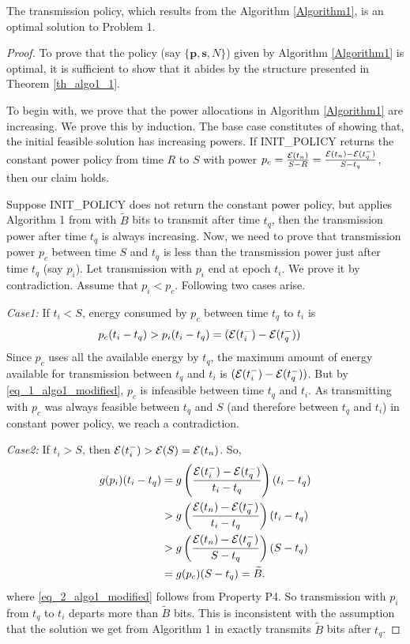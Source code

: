 \begin{theorem}
The transmission policy, which results from the Algorithm \ref{Algorithm1}, is an optimal solution to Problem 1.
\label{th_algo1_2}
\end{theorem}


\begin{proof}
To prove that the policy (say $\{\textbf{p},\textbf{s},N\}$) given by Algorithm \ref{Algorithm1} is optimal, it is sufficient to show that it abides by the structure presented in Theorem \ref{th_algo1_1}.

To begin with, we prove that the power allocations in Algorithm \ref{Algorithm1} are increasing. We prove this by induction. The base case constitutes of showing that, the initial feasible solution has increasing powers. If INIT\_POLICY returns the constant power policy from time $R$ to $S$ with power $p_c=\frac{\mathcal{E}(t_n)}{S-R}=\frac{\mathcal{E}(t_n)-\mathcal{E}(t_q^-)}{S-t_q}$, then our claim holds. 

Suppose INIT\_POLICY does not return the constant power policy, but applies Algorithm 1 from \cite{Yang} with $\widetilde{B}$ bits to transmit after time $t_q$, then the transmission power after time $t_q$ is always increasing. Now, we need to prove that transmission power $p_c$ between time $S$ and $t_q$ is less than the transmission power just after time $t_q$ (say $p_i$). Let transmission with $p_i$ end at epoch $t_i$. We prove it by contradiction. Assume that $p_i<p_c$. Following two cases arise.

\textit{Case1:} If $t_i<S$, energy consumed by $p_c$ between time $t_q$ to $t_i$ is 
\begin{align}
&p_c(t_i-t_q)>p_i(t_i-t_q)=(\ETx(t_i^-)-\ETx(t_q^-))\label{eq_1_algo1_modified}
\end{align}
Since $p_c$ uses all the available energy by $t_q$, the maximum amount of energy available for transmission between $t_q$ and $t_i$ is $(\mathcal{E}(t_i^-)-\mathcal{E}(t_q^-))$. But by \eqref{eq_1_algo1_modified}, $p_c$ is infeasible between time $t_q$ and $t_i$. As transmitting with $p_c$ was always feasible between $t_q$ and $S$ (and therefore between $t_q$ and $t_i$) in constant power policy, we reach a contradiction.        

\textit{Case2:} If $t_i>S$, then $\mathcal{E}(t_i^-)>\mathcal{E}(S)=\mathcal{E}(t_n)$. So, 
\begin{align}
g(p_i)(t_i-t_q)&=g\left(\frac{\ETx(t_i^-)-\ETx(t_q^-)}{t_i-t_q}\right)(t_i-t_q)
\\
&>g\left(\frac{\ETx(t_n)-\ETx(t_q^-)}{t_i-t_q}\right)(t_i-t_q)
\\
&>g\left(\frac{\ETx(t_n)-\ETx(t_q^-)}{S-t_q}\right)(S-t_q)\label{eq_2_algo1_modified}
\\
&=g(p_c)(S-t_q)=\widetilde{B}.
\end{align}
where \eqref{eq_2_algo1_modified} follows from Property P4. So transmission with $p_i$ from $t_q$ to $t_i$ departs more than $\widetilde{B}$ bits. This is inconsistent with the assumption that the solution we get from Algorithm 1 in \cite{Yang} exactly transmits $\widetilde{B}$ bits after $t_q$. 


\end{proof}

